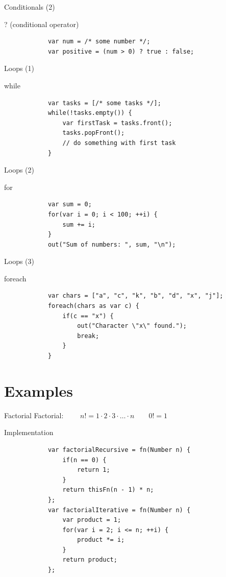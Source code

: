 \documentclass[ucs,9pt]{beamer}
\begin{document}
\begin{frame}[fragile]{Conditionals (2)}
	\begin{block}{? (conditional operator)}
		\begin{lstlisting}
			var num = /* some number */;
			var positive = (num > 0) ? true : false;
		\end{lstlisting}
	\end{block}
\end{frame}

\begin{frame}[fragile]{Loops (1)}
	\begin{block}{while}
		\begin{lstlisting}
			var tasks = [/* some tasks */];
			while(!tasks.empty()) {
			    var firstTask = tasks.front();
			    tasks.popFront();
			    // do something with first task
			}
		\end{lstlisting}
	\end{block}
\end{frame}

\begin{frame}[fragile]{Loops (2)}
	\begin{block}{for}
		\begin{lstlisting}
			var sum = 0;
			for(var i = 0; i < 100; ++i) {
			    sum += i;
			}
			out("Sum of numbers: ", sum, "\n");
		\end{lstlisting}
	\end{block}
\end{frame}

\begin{frame}[fragile]{Loops (3)}
	\begin{block}{foreach}
		\begin{lstlisting}
			var chars = ["a", "c", "k", "b", "d", "x", "j"];
			foreach(chars as var c) {
			    if(c == "x") {
			        out("Character \"x\" found.");
			        break;
			    }
			}
		\end{lstlisting}
	\end{block}
\end{frame}

\section{Examples}
\begin{frame}[fragile]{Factorial}
	Factorial: $\qquad n! = 1 \cdot 2 \cdot 3 \cdot \ldots \cdot n \qquad 0! = 1$
	\begin{block}{Implementation}
		\begin{lstlisting}
			var factorialRecursive = fn(Number n) {
			    if(n == 0) {
			        return 1;
			    }
			    return thisFn(n - 1) * n;
			};
			var factorialIterative = fn(Number n) {
			    var product = 1;
			    for(var i = 2; i <= n; ++i) {
			        product *= i;
			    }
			    return product;
			};
		\end{lstlisting}
	\end{block}
\end{frame}
\end{document}
